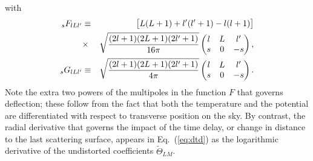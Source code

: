 \documentclass[prd,amsmath,amssymb,floatfix,superscriptaddress,nofootinbib,twocolumn]{revtex4-1}
\def\bea{\begin{eqnarray}}
\def\eea{\end{eqnarray}}
\newcommand{\ec}[1]{Eq.~(\ref{eq:#1})}
\newcommand{\eql}[1]{\label{eq:#1}}
\begin{document}
with
\bea
{}_{s}F_{lLl'} &\equiv& \big[L(L+1)+l'(l'+1)-l(l+1)\big]\nonumber  \\ & \times&\sqrt{ \frac{ (2l+1)(2L+1)(2l'+1) }{16 \pi} }\begin{pmatrix} l & L & l'  \\   s & 0 & -s  \end{pmatrix} ,\nonumber\\
{}_{s}G_{lLl'} &\equiv& \sqrt{ \frac{(2l+1)(2L+1)(2l'+1) }{4 \pi}} \begin{pmatrix} l & L & l' \\  \vphantom{a^b} s & 0 & -s  \end{pmatrix}\eql{fg} 
.\eea
Note the extra two powers of the multipoles in the function $F$ that governs deflection; these follow from the fact that both the temperature and the potential are differentiated with respect to transverse position on the sky. By contrast, the radial derivative that governs the impact of the time delay, or change in distance to the last scattering surface, appears in \ec{dtd} as the logarithmic derivative of the undistorted coefficients $\tilde\Theta_{LM}$.
\end{document}
